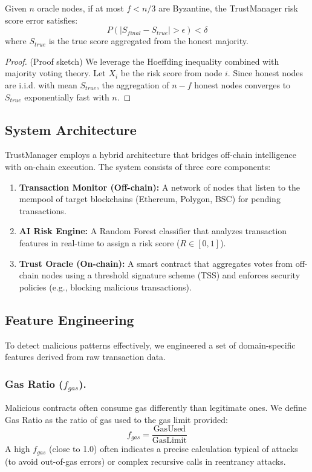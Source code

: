 \begin{theorem}
Given $n$ oracle nodes, if at most $f < n/3$ are Byzantine, the TrustManager risk score error satisfies:
$$P(|S_{final} - S_{true}| > \epsilon) < \delta$$
where $S_{true}$ is the true score aggregated from the honest majority.
\end{theorem}

\begin{proof}
(Proof sketch) We leverage the Hoeffding inequality combined with majority voting theory. Let $X_i$ be the risk score from node $i$. Since honest nodes are i.i.d. with mean $S_{true}$, the aggregation of $n-f$ honest nodes converges to $S_{true}$ exponentially fast with $n$.
\end{proof}

\subsection{System Architecture}
TrustManager employs a hybrid architecture that bridges off-chain intelligence with on-chain execution. The system consists of three core components:
\begin{enumerate}
    \item \textbf{Transaction Monitor (Off-chain):} A network of nodes that listen to the mempool of target blockchains (Ethereum, Polygon, BSC) for pending transactions.
    \item \textbf{AI Risk Engine:} A Random Forest classifier that analyzes transaction features in real-time to assign a risk score ($R \in [0, 1]$).
    \item \textbf{Trust Oracle (On-chain):} A smart contract that aggregates votes from off-chain nodes using a threshold signature scheme (TSS) and enforces security policies (e.g., blocking malicious transactions).
\end{enumerate}

\subsection{Feature Engineering}
To detect malicious patterns effectively, we engineered a set of domain-specific features derived from raw transaction data.

\subsubsection{Gas Ratio ($f_{gas}$).}
Malicious contracts often consume gas differently than legitimate ones. We define Gas Ratio as the ratio of gas used to the gas limit provided:
\begin{equation}
    f_{gas} = \frac{\text{GasUsed}}{\text{GasLimit}}
\end{equation}
A high $f_{gas}$ (close to 1.0) often indicates a precise calculation typical of attacks (to avoid out-of-gas errors) or complex recursive calls in reentrancy attacks.

